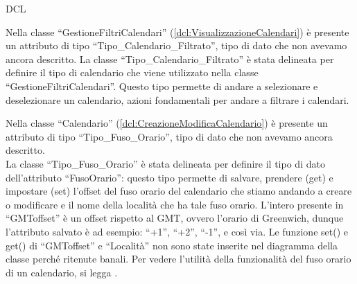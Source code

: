 \begin{listaPersonale}{DCL}
    \begin{center}
        
    \end{center}
    \newpage



    Nella classe “GestioneFiltriCalendari” (\ref{dcl:VisualizzazioneCalendari}) è presente un attributo di tipo “Tipo\_Calendario\_Filtrato”, tipo di dato che non avevamo ancora descritto. La classe “Tipo\_Calendario\_Filtrato” è stata delineata per definire il tipo di calendario che viene utilizzato nella classe “GestioneFiltriCalendari”. Questo tipo permette di andare a selezionare e deselezionare un calendario, azioni fondamentali per andare a filtrare i calendari.


    \begin{center}
        
    \end{center}





    Nella classe “Calendario” (\ref{dcl:CreazioneModificaCalendario}) è presente un attributo di tipo “Tipo\_Fuso\_Orario”, tipo di dato che non avevamo ancora descritto. \\
    La classe “Tipo\_Fuso\_Orario” è stata delineata per definire il tipo di dato dell'attributo “FusoOrario”: questo tipo permette di salvare, prendere (get) e impostare (set) l'offset del fuso orario del calendario che stiamo andando a creare o modificare e il nome della località che ha tale fuso orario. L'intero presente in “GMToffset” è un offset rispetto al GMT, ovvero l'orario di Greenwich, dunque l'attributo salvato è ad esempio: “+1”, “+2”, “-1”, e così via. Le funzione set() e get() di “GMToffset” e “Località” non sono state inserite nel diagramma della classe perché ritenute banali. Per vedere l'utilità della funzionalità del fuso orario di un calendario, si legga .



\end{listaPersonale}
